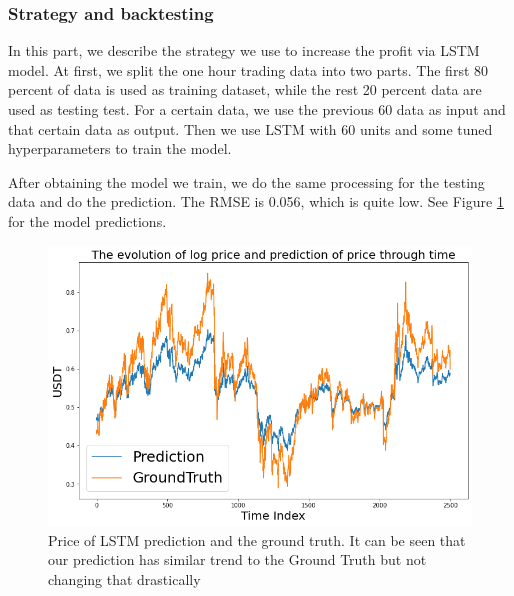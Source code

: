 \documentclass[twoside]{report}
\begin{document}
\begin{spacing}{1}
\subsubsection{Strategy and backtesting}
In this part, we describe the strategy we use to increase the profit via LSTM model. At first, we split the one hour trading data into two parts. The first 80 percent of data is used as training dataset, while the rest 20 percent data are used as testing test. For a certain data, we use the previous 60 data as input and that certain data as output. Then we use LSTM with 60 units and some tuned hyperparameters to train the model.

After obtaining the model we train, we do the same processing for the testing data and do the prediction. The RMSE is 0.056, which is quite low. See Figure \ref{fig:LSTM price} for the model predictions.


\begin{figure}[!htbp]
    \centering
    \includegraphics[scale = 0.5]{Images/LSTM price.png}
    \caption{Price of LSTM prediction and the ground truth. It can be seen that our prediction has similar trend to the Ground Truth but not changing that drastically}
    \label{fig:LSTM price}
\end{figure}


\end{spacing}
\end{document}
